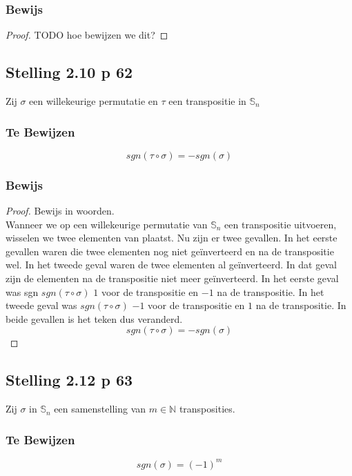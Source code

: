 \documentclass[lineaire_algebra_oplossingen.tex]{subfiles}
\begin{document}
\subsubsection*{Bewijs}
\begin{proof}
TODO hoe bewijzen we dit?
\end{proof}

\subsection{Stelling 2.10 p 62}
Zij $\sigma$ een willekeurige permutatie en $\tau$ een transpositie in $\mathbb{S}_n$
\subsubsection*{Te Bewijzen}
\[
sgn(\tau \circ \sigma) = - sgn(\sigma)
\]
\subsubsection*{Bewijs}
\begin{proof}
Bewijs in woorden.\\
Wanneer we op een willekeurige permutatie van $\mathbb{S}_n$ een transpositie uitvoeren, wisselen we twee elementen van plaatst. Nu zijn er twee gevallen. In het eerste gevallen waren die twee elementen nog niet ge\"inverteerd en na de transpositie wel. In het tweede geval waren de twee elementen al ge\"inverteerd. In dat geval zijn de elementen na de transpositie niet meer ge\"inverteerd. In het eerste geval was sgn $sgn(\tau \circ \sigma)$ $1$ voor de transpositie en $-1$ na de transpositie. In het tweede geval was $sgn(\tau \circ \sigma)$ $-1$ voor de transpositie en $1$ na de transpositie. In beide gevallen is het teken dus veranderd.
\[
sgn(\tau \circ \sigma) = - sgn(\sigma)
\]
\end{proof}

\subsection{Stelling 2.12 p 63}
Zij $\sigma$ in $\mathbb{S}_n$ een samenstelling van $m \in \mathbb{N}$ transposities.
\subsubsection*{Te Bewijzen}
\[
sgn(\sigma) = (-1)^{m}
\]
\end{document}
